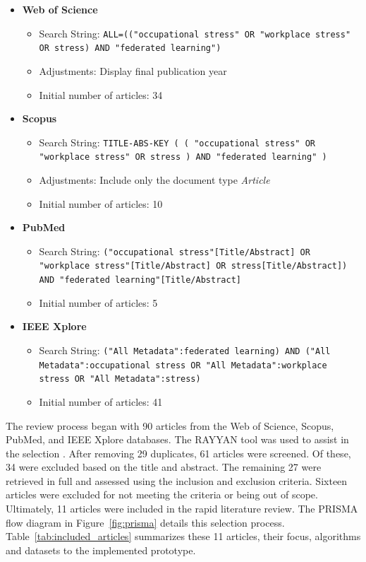 \documentclass[12pt]{article}
\begin{document}
\begin{itemize}
    \item \textbf{Web of Science}
    \begin{itemize}
        \item Search String: \texttt{ALL=(("occupational stress" OR "workplace stress" OR stress) AND "federated learning")}
        \item Adjustments: Display final publication year
        \item Initial number of articles: 34
    \end{itemize}
    \item \textbf{Scopus}
    \begin{itemize}
        \item Search String: \texttt{TITLE-ABS-KEY ( ( "occupational stress" OR "workplace stress" OR stress ) AND "federated learning" )}
        \item Adjustments: Include only the document type \textit{Article}
        \item Initial number of articles: 10
    \end{itemize}
    \item \textbf{PubMed}
    \begin{itemize}
        \item Search String: \texttt{("occupational stress"[Title/Abstract] OR "workplace stress"[Title/Abstract] OR stress[Title/Abstract]) AND "federated learning"[Title/Abstract]}
        \item Initial number of articles: 5
    \end{itemize}
    \item \textbf{IEEE Xplore}
    \begin{itemize}
        \item Search String: \texttt{("All Metadata":federated learning) AND ("All Metadata":occupational stress OR "All Metadata":workplace stress OR "All Metadata":stress)}
        \item Initial number of articles: 41
    \end{itemize}
\end{itemize}

The review process began with 90 articles from the Web of Science, Scopus, PubMed, and IEEE Xplore databases. The RAYYAN tool was used to assist in the selection \cite{nastasha_johnson_93d644ed}. After removing 29 duplicates, 61 articles were screened. Of these, 34 were excluded based on the title and abstract. The remaining 27 were retrieved in full and assessed using the inclusion and exclusion criteria. Sixteen articles were excluded for not meeting the criteria or being out of scope. Ultimately, 11 articles were included in the rapid literature review. The PRISMA flow diagram in Figure~\ref{fig:prisma} details this selection process. Table~\ref{tab:included_articles} summarizes these 11 articles, their focus, algorithms and datasets to the implemented prototype.
\end{document}
